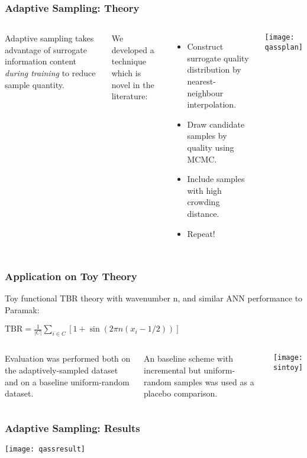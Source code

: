 \begin{frame}
	\frametitle{Adaptive Sampling: Theory}
	 \begin{columns}[onlytextwidth,T]
      \column{\dimexpr\linewidth-6cm-5mm}
        
        Adaptive sampling takes advantage of surrogate information content \textit{during training} to reduce sample quantity.\newline
        
        We developed a technique which is novel in the literature:
        \begin{itemize}
        \item Construct surrogate quality distribution by nearest- neighbour interpolation.
        \item Draw candidate samples by quality using MCMC.
        \item Include samples with high crowding distance.
        \item Repeat!
        \end{itemize}
      \column{6cm}
      \texttt{[image: qassplan]}

    \end{columns}
\end{frame}

\begin{frame}
	\frametitle{Application on Toy Theory}
	        Toy functional TBR theory with wavenumber n, and similar ANN performance to Paramak:\newline

        \begin{center}
        $\text{TBR} = \frac{1}{|C|}\sum_{i \in C} \left[1 + \sin(2\pi n (x_i - 1/2)) \right]$\newline
        \end{center}
    \begin{columns}[onlytextwidth,T]
      \column{\dimexpr\linewidth-4cm-5mm}
        
        Evaluation was performed both on the adaptively-sampled dataset and on a baseline uniform-random dataset.\newline
        
        An baseline scheme with incremental but uniform-random samples was used as a placebo comparison.
        

      \column{4cm}
      \texttt{[image: sintoy]}

    \end{columns}
\end{frame}

\begin{frame}
    \frametitle{Adaptive Sampling: Results}
    
    \begin{center}
    \texttt{[image: qassresult]}
    \end{center}

\end{frame}
